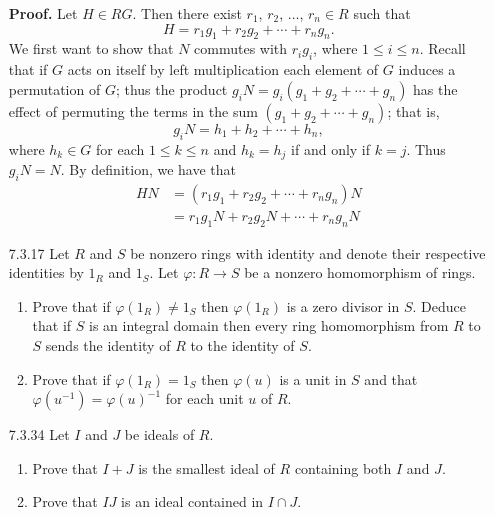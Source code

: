 \documentclass[9pt]{article}
\begin{document}
\begin{enumerate}
      \textbf{Proof.} Let $H \in RG$. Then there exist $r_1$, $r_2$, $\ldots$,
      $r_n \in R$ such that
      $$H = r_1g_1 + r_2g_2 + \cdots + r_ng_n.$$
      We first want to show that $N$ commutes with $r_ig_i$, where
      $1 \le i \le n$. Recall that if $G$ acts on itself by left multiplication
      each element of $G$ induces a permutation of $G$; thus the product
      $g_iN = g_i(g_1 + g_2 + \cdots + g_n)$ has the effect of permuting the 
      terms in the sum $(g_1 + g_2 + \cdots + g_n)$; that is,
      $$g_iN = h_1 + h_2 + \cdots + h_n,$$
      where $h_k \in G$ for each $1 \le k \le n$ and $h_k = h_j$ if and only if 
      $k = j$. Thus $g_iN = N$.  By definition, we have that
      \begin{align*}
         HN &= (r_1g_1 + r_2g_2 + \cdots + r_ng_n)N \\
            &= r_1g_1N + r_2g_2N + \cdots + r_ng_nN
      \end{align*}
   \item[7.3.17]  Let $R$ and $S$ be nonzero rings with identity and denote
                  their respective identities by $1_R$ and $1_S$. Let
                  $\varphi : R \rightarrow S$ be a nonzero homomorphism of
                  rings.
                  \begin{enumerate}
                     \item Prove that if $\varphi(1_R) \neq 1_S$ then
                           $\varphi(1_R)$ is a zero divisor in $S$. Deduce that
                           if $S$ is an integral domain then every ring
                           homomorphism from $R$ to $S$ sends the identity of
                           $R$ to the identity of $S$.
                     \item Prove that if $\varphi(1_R) = 1_S$ then $\varphi(u)$
                           is a unit in $S$ and that
                           $\varphi(u^{-1}) = \varphi(u)^{-1}$ for each unit $u$
                           of $R$.
                  \end{enumerate}
   \item[7.3.34]  Let $I$ and $J$ be ideals of $R$.
                  \begin{enumerate}
                     \item Prove that $I + J$ is the smallest ideal of $R$
                           containing both $I$ and $J$.
                     \item Prove that $IJ$ is an ideal contained in $I \cap J$.

\end{enumerate}
\end{enumerate}
\end{document}
